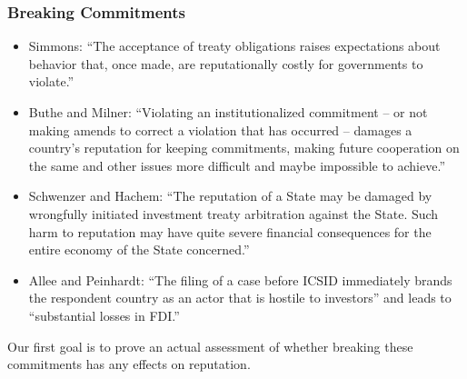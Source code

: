 \documentclass[10pt]{beamer}
\begin{document}
\begin{frame}
\frametitle{Breaking Commitments}

\begin{itemize}
	\item Simmons: ``The acceptance of treaty obligations raises expectations about behavior that, once made, are reputationally costly for governments to violate.'' 
	\item Buthe and Milner: ``Violating an institutionalized commitment – or not making amends to correct a violation that has occurred – damages a country's reputation for keeping commitments, making future cooperation on the same and other issues more difficult and maybe impossible to achieve.'' 
	\item Schwenzer and Hachem: ``The reputation of a State may be damaged by wrongfully initiated investment treaty arbitration against the State. Such harm to reputation may have quite severe financial consequences for the entire economy of the State concerned.'' 
	\item Allee and Peinhardt: ``The filing of a case before ICSID immediately brands the respondent country as an actor that is hostile to investors'' and leads to ``substantial losses in FDI.''
\end{itemize}



\begin{block}
Our first goal is to prove an actual assessment of whether breaking these commitments has any effects on reputation. 
\end{block}

\end{frame}
\end{document}
